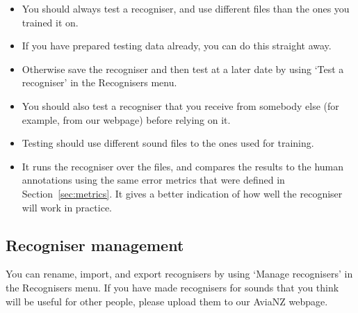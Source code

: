 \documentclass{article}
\begin{document}
\begin{itemize}
\item You should always test a recogniser, and use different files than the ones you trained it on.
\item If you have prepared testing data already, you can do this straight away. 
\item Otherwise save the recogniser and then test at a later date by using `Test a recogniser' in the Recognisers menu.
\item You should also test a recogniser that you receive from somebody else (for example, from our webpage) before relying on it.
\item Testing should use different sound files to the ones used for training. 
\item It runs the recogniser over the files, and compares the results to the human annotations using the same error metrics that were defined in Section~\ref{sec:metrics}. It gives a better indication of how well the recogniser will work in practice. %

\end{itemize}

\subsection{Recogniser management}\label{sec:filters}

You can rename, import, and export recognisers by using `Manage recognisers' in the Recognisers menu. If you have made recognisers for sounds that you think will be useful for other people, please upload them to our AviaNZ webpage.   
\end{document}
